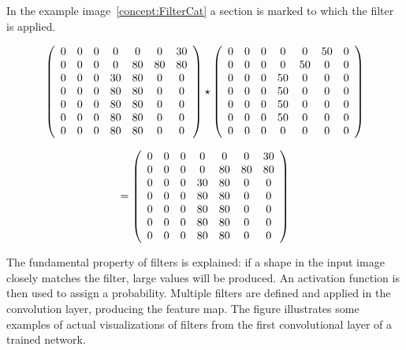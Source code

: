{	In the example image~\ref{concept:FilterCat} a section is marked to which the filter is applied. 
	
	
	
	$$
	\left(
	\begin{array}{ccc ccc c}
		0 & 0 & 0 &  0 & 0  &  0 & 30 \\
		0 & 0 & 0 &  0 & 80 & 80 & 80 \\
		0 & 0 & 0 & 30 & 80 &  0 &  0 \\
		0 & 0 & 0 & 80 & 80 &  0 &  0 \\
		0 & 0 & 0 & 80 & 80 &  0 &  0 \\
		0 & 0 & 0 & 80 & 80 &  0 &  0 \\
		0 & 0 & 0 & 80 & 80 &  0 &  0 \\
	\end{array}
	\right)
	\star
	\left(
	\begin{array}{ccc ccc c}
		0 & 0 & 0 &  0 & 0  & 50 & 0 \\
		0 & 0 & 0 &  0 & 50 &  0 & 0 \\
		0 & 0 & 0 & 50 &  0 &  0 & 0 \\
		0 & 0 & 0 & 50 &  0 &  0 & 0 \\
		0 & 0 & 0 & 50 &  0 &  0 & 0 \\
		0 & 0 & 0 & 50 &  0 &  0 & 0 \\
		0 & 0 & 0 &  0 &  0 &  0 & 0 \\
	\end{array}
	\right)$$
	
	$$
	=
	\left(
	\begin{array}{ccc ccc c}
		0 & 0 & 0 &  0 & 0  &  0 & 30 \\
		0 & 0 & 0 &  0 & 80 & 80 & 80 \\
		0 & 0 & 0 & 30 & 80 &  0 &  0 \\
		0 & 0 & 0 & 80 & 80 &  0 &  0 \\
		0 & 0 & 0 & 80 & 80 &  0 &  0 \\
		0 & 0 & 0 & 80 & 80 &  0 &  0 \\
		0 & 0 & 0 & 80 & 80 &  0 &  0 \\
	\end{array}
	\right)
	$$  
	
	The fundamental property of filters is explained: if a shape in the input image closely matches the filter, large values will be produced. An activation function is then used to assign a probability. Multiple filters are defined and applied in the convolution layer, producing the feature map. The figure illustrates some examples of actual visualizations of filters from the first convolutional layer of a trained network.
	
}
